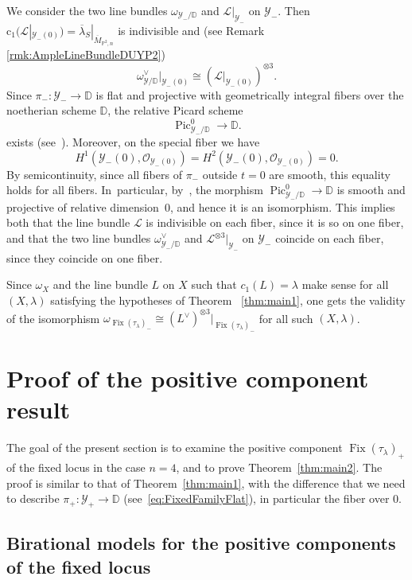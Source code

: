 \documentclass[11pt]{article}
\newcommand{\DD}{{\mathbb D}}
\newcommand{\PP}{{\mathbb P}}\let\P\PP
\newcommand\cL{\mathcal{L}}
\newcommand\cO{\mathcal{O}}
\newcommand\cY{\mathcal{Y}}
\DeclareMathOperator{\Fix}{Fix}
\DeclareMathOperator{\Pic}{Pic}
\theoremstyle{definition}
\begin{document}
We consider the two line bundles $\omega_{\cY_-/\DD}$ and $\cL |_{\cY_-}$ on $\cY_-$.
Then $\mathrm{c}_1(\cL |_{\cY_{-}(0)})=\overline{\lambda}{}_S|_{\overline{M}_{\PP^2,n}}$ is indivisible and (see Remark \ref{rmk:AmpleLineBundleDUYP2})
\[
\omega_{\cY/\DD}^\vee |_{\cY_{-}(0)} \cong \left(\cL |_{\cY_{-}(0)}\right)^{\otimes 3}.
\]
Since $\pi_-\colon\cY_-\to \DD$ is flat and projective with geometrically integral fibers over the noetherian scheme $\DD$, the relative Picard scheme
\[
\Pic_{\cY_-/\DD}^0\to \DD.
\]
exists (see~\cite[Th.\,4.8]{Kleiman:Picard}).
Moreover, on the special fiber we have
\[
H^1(\cY_{-}(0),\cO_{\cY_{-}(0)})=H^2(\cY_{-}(0),\cO_{\cY_{-}(0)})=0.
\]
By semicontinuity, since all fibers of $\pi_-$ outside $t=0$ are smooth, this equality holds for all fibers. In~particular, by~\cite[Prop.\,5.19]{Kleiman:Picard}, the morphism $\Pic_{\cY_-/\DD}^0\to \DD$ is smooth and projective of relative dimension~0, and hence it is an isomorphism.
This implies both that the line bundle $\cL$ is indivisible on each fiber, since it is so on one fiber, and that the two line bundles $\omega_{\cY_-/\DD}^\vee$ and $\cL^{\otimes 3} |_{\cY_-}$ on $\cY_-$ coincide on each fiber, since they coincide on one fiber.

Since $\omega_X$ and the line bundle $L$ on $X$ such that $c_1(L)=\lambda$ make sense for all $(X,\lambda)$ satisfying the hypotheses of Theorem ~\ref{thm:main1}, one gets the validity of the isomorphism $\omega_{\Fix(\tau_{\lambda})_-}\cong (L^{\vee})^{\otimes 3}\vert_{\Fix(\tau_{\lambda})_-}$ for all such $(X, \lambda)$.

\section{Proof of the positive component result}\label{sec:cubic4folds}

The goal of the present section is to examine the positive component $\Fix(\tau_{\lambda})_+$ of the fixed locus in the case $n=4$, and to prove Theorem~\ref{thm:main2}.
The proof is similar to that of Theorem~\ref{thm:main1}, with the difference that we need to describe $\pi_{+}\colon \cY_{+}\to\DD$ (see~\eqref{eq:FixedFamilyFlat}), in particular the fiber over $0$.

\subsection{Birational models for the positive components of the fixed locus}\label{subsection:SecondComponentDegree2}
\end{document}
